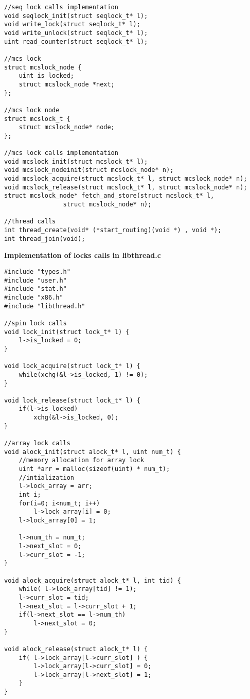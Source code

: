 \documentclass[a4paper, 11pt]{article}
\begin{document}
\begin{itemize}
\begin{lstlisting}
//seq lock calls implementation
void seqlock_init(struct seqlock_t* l);
void write_lock(struct seqlock_t* l);
void write_unlock(struct seqlock_t* l);
uint read_counter(struct seqlock_t* l);

//mcs lock
struct mcslock_node {
    uint is_locked;
    struct mcslock_node *next;
};

//mcs lock node
struct mcslock_t {
    struct mcslock_node* node;
};

//mcs lock calls implementation
void mcslock_init(struct mcslock_t* l);
void mcslock_nodeinit(struct mcslock_node* n);
void mcslock_acquire(struct mcslock_t* l, struct mcslock_node* n);
void mcslock_release(struct mcslock_t* l, struct mcslock_node* n);
struct mcslock_node* fetch_and_store(struct mcslock_t* l, 
				struct mcslock_node* n);

//thread calls
int thread_create(void* (*start_routing)(void *) , void *);
int thread_join(void);

\end{lstlisting}

\textbf{Implementation of locks calls in libthread.c}
\begin{lstlisting}
#include "types.h"
#include "user.h"
#include "stat.h"
#include "x86.h"
#include "libthread.h"

//spin lock calls
void lock_init(struct lock_t* l) {
    l->is_locked = 0;
}

void lock_acquire(struct lock_t* l) {
    while(xchg(&l->is_locked, 1) != 0);
}

void lock_release(struct lock_t* l) {
    if(l->is_locked)
        xchg(&l->is_locked, 0); 
}

//array lock calls
void alock_init(struct alock_t* l, uint num_t) {
    //memory allocation for array lock
    uint *arr = malloc(sizeof(uint) * num_t);
    //intialization
    l->lock_array = arr;
    int i;
    for(i=0; i<num_t; i++)
        l->lock_array[i] = 0;
    l->lock_array[0] = 1;

    l->num_th = num_t;
    l->next_slot = 0;
    l->curr_slot = -1;
}

void alock_acquire(struct alock_t* l, int tid) {
    while( l->lock_array[tid] != 1);
    l->curr_slot = tid;
    l->next_slot = l->curr_slot + 1;
    if(l->next_slot == l->num_th)
        l->next_slot = 0;
}

void alock_release(struct alock_t* l) {
    if( l->lock_array[l->curr_slot] ) {
        l->lock_array[l->curr_slot] = 0;
        l->lock_array[l->next_slot] = 1;
    }
}


\end{lstlisting}
\end{itemize}
\end{document}
